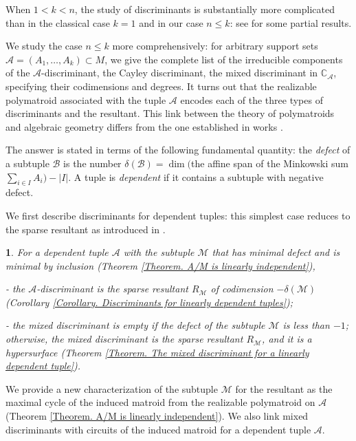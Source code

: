 \documentclass[11pt]{article}
\theoremstyle{plain}
\newtheorem{thm}{\protect\theoremname}[section]
\theoremstyle{definition}
\theoremstyle{remark}
\theoremstyle{plain}
\theoremstyle{plain}
\theoremstyle{plain}
\theoremstyle{definition}
\providecommand{\theoremname}{Theorem}
\begin{document}
When $1<k<n$, the study of discriminants is substantially more complicated
than in the classical case $k=1$ and in our case $n\leq k$: see
\cite{esterov_newton_2010,esterov_discriminant_2013,dickenstein_iterated_2023}
for some partial results.

We study the case $n\leq k$ more comprehensively: for arbitrary support
sets $\mathscr{A}=(A_{1},\ldots,A_{k})\subset M$, we give the complete
list of the irreducible components of the $\mathscr{A}$-discriminant,
the Cayley discriminant, the mixed discriminant in $\mathbb{C}_{\mathscr{A}}$,
specifying their codimensions and degrees. It turns out that the realizable
polymatroid associated with the tuple $\mathscr{A}$ encodes each
of the three types of discriminants and the resultant. This link between
the theory of polymatroids and algebraic geometry differs from the
one established in works \cite{pagaria_hodge_2023,crowley_bergman_2024}. 

The answer is stated in terms of the following fundamental quantity:
the \textit{defect} of a subtuple $\mathscr{B}$ is the number $\delta(\mathscr{B})=\dim($the
affine span of the Minkowski sum $\sum_{i\in I}A_{i})-|I|$. A tuple
is\textit{ dependent} if it contains a subtuple with negative defect.

We first describe discriminants for dependent tuples: this simplest
case reduces to the sparse resultant as introduced in \cite{sturmfels_newton_1994}. 
\begin{thm}
\label{Theorem. Introduction. Discriminants for linearly dependent tuples}For
a dependent tuple $\mathscr{A}$ with the subtuple $\mathscr{M}$
that has minimal defect and is minimal by inclusion \textup{(Theorem
\ref{Theorem. A/M  is linearly independent})}, 

- the $\mathscr{A}$-discriminant is the sparse resultant $R_{\mathscr{M}}$
of codimension $-\delta(\mathscr{M})$\textup{ (Corollary \ref{Corollary. Discriminants for linearly dependent tuples})}; 

- the mixed discriminant is empty if the defect of the subtuple $\mathscr{M}$
is less than $-1$; otherwise, the mixed discriminant is the sparse
resultant $R_{\mathscr{M}}$, and it is a hypersurface\textup{ (Theorem
\ref{Theorem. The mixed discriminant for a linearly dependent tuple}).}
\end{thm}

We provide a new characterization of the subtuple $\mathscr{M}$ for
the resultant as the maximal cycle of the induced matroid from the
realizable polymatroid on $\mathscr{A}$ (Theorem \ref{Theorem. A/M  is linearly independent}).
We also link mixed discriminants with circuits of the induced matroid
for a dependent tuple $\mathscr{A}$.
\end{document}
